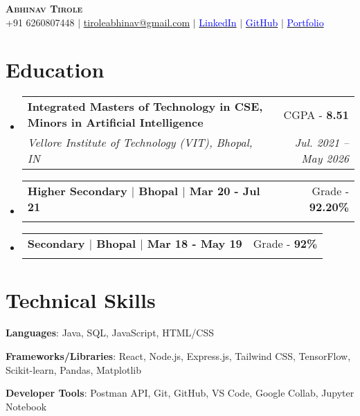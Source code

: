 \documentclass[letterpaper,11pt]{article}
\makeatletter
\newcommand{\resumeSubheading}[4]{
  \vspace{-2pt}\item
    \begin{tabular*}{0.97\textwidth}[t]{l@{\extracolsep{\fill}}r}
      \textbf{#1} & #2 \\
      \textit{\small#3} & \textit{\small #4} \\
    \end{tabular*}\vspace{-7pt}
}
\newcommand{\resumeSubHeadingListStart}{\begin{itemize}[leftmargin=0.15in, label={}]}
\newcommand{\resumeSubHeadingListEnd}{\end{itemize}}
\makeatother
\begin{document}

\begin{center}
    \textbf{\Huge \scshape Abhinav Tirole} \\ \vspace{2pt}
    \small +91 6260807448 $|$ \href{mailto:tiroleabhinav@gmail.com}{{tiroleabhinav@gmail.com}} $|$ 
    \href{https://www.linkedin.com/in/abhinavtirole2003/}{\textcolor{blue}{LinkedIn}} $|$
    \href{https://github.com/ABHINAV2087}{\textcolor{blue}{GitHub}} $|$ \href{www.abhinavtirole.tech}{\textcolor{blue}{Portfolio}}
\end{center}


\section{Education}
 \resumeSubHeadingListStart
    \resumeSubheading
      {Integrated Masters of Technology in CSE, Minors in Artificial Intelligence}{CGPA - \textbf{8.51}}
      {Vellore Institute of Technology (VIT), Bhopal, IN}{Jul. 2021 -- May 2026}
    \resumeSubheading
      {Higher Secondary $|$ Bhopal $|$ Mar 20 - Jul 21}{Grade - \textbf{92.20\%}}
      {\vspace{-2mm}}{\vspace{-2mm}}
       \vspace{-2mm}
    \resumeSubheading
      {Secondary $|$ Bhopal $|$ Mar 18 - May 19}{Grade - \textbf{92\%}}
      {\vspace{-2mm}}{\vspace{-2mm}}
\resumeSubHeadingListEnd


\section{Technical Skills}
\begin{itemize}[leftmargin=0.15in, label={}, itemsep=2pt, parsep=2pt]
    \small{
        \item \textbf{Languages}:  Java, SQL, JavaScript, HTML/CSS  
        \item \textbf{Frameworks/Libraries}:  React, Node.js, Express.js, Tailwind CSS, TensorFlow, Scikit-learn, Pandas, Matplotlib  
        \item \textbf{Developer Tools}:  Postman API, Git, GitHub, VS Code, Google Collab, Jupyter Notebook 
         
    }
\end{itemize}
\end{document}
